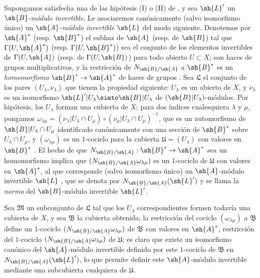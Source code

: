 \documentclass[oneside,10pt]{amsart}
\makeatletter
\newcommand{\ega@arrow}[2]{\mathchoice{#1}{#2}{#2}{#2}}
\renewcommand{\to}{\ega@arrow{\longrightarrow}{\rightarrow}}
\newcommand{\oldpage}[2][]{\marginnote{\normalfont\footnotesize\textbf{#1}~|~#2}\ignorespaces}
\let\EGAOriginalLabel\label
\renewcommand{\label}[1]{\phantomsection\EGAOriginalLabel{#1}}
\makeatother
\begin{document}
\begin{env}[6.5.2]
\label{II.6.5.2}
Supongamos satisfecha una de las hipótesis (I) o (II) de , y sea $\sh{L}'$ un $\sh{B}$-\emph{módulo invertible}.
Le asociaremos canónicamente (salvo isomorfismo único) un $\sh{A}$-\emph{módulo invertible} $\sh{L}$ del modo siguiente.
Denotemos por $\sh{A}^*$ (resp. $\sh{B}^*$) el subhaz de $\sh{A}$ (resp. de $\sh{B}$) tal que $\Gamma(U,\sh{A}^*)$ (resp. $\Gamma(U,\sh{B}^*)$) sea el conjunto de los elementos invertibles de $\Gamma(U,\sh{A})$ (resp. de $\Gamma(U,\sh{B})$) para todo abierto $U\subset X$;
\oldpage[II]{127}
son haces de grupos multiplicativos, y la restricción de $N_{\sh{B}/\sh{A}}$ a $\sh{B}^*$ es un \emph{homomorfismo} $\sh{B}^*\to\sh{A}^*$ de haces de grupos .
Sea $\mathfrak{L}$ el conjunto de los pares $(U_\lambda,\nu_\lambda)$ que tienen la propiedad siguiente: $U_\lambda$ es un abierto de $X$, y $\nu_\lambda$ es un isomorfismo $\sh{L}'|U_\lambda\simto\sh{B}|U_\lambda$ de $(\sh{B}|U_\lambda)$-módulos.
Por hipótesis, los $U_\lambda$ forman una cubierta de $X$;
para dos índices cualesquiera $\lambda$ y $\mu$, pongamos $\omega_{\lambda\mu}=(\nu_\lambda|U_\lambda\cap U_\mu)\circ(\nu_\mu|U_\lambda\cap U_\mu)^{-1}$, que es un automorfismo de $\sh{B}|U_\lambda\cap U_\mu$ identificado canónicamente con una sección de $\sh{B}^*$ sobre $U_\lambda\cap U_\mu$, y $(\omega_{\lambda\mu})$ es un $1$-cociclo para la cubierta $\mathfrak{U}=(U_\lambda)$ con valores en $\sh{B}^*$ .
El hecho de que $N_{\sh{B}/\sh{A}}:\sh{B}^*\to\sh{A}^*$ sea un homomorfismo implica que $(N_{\sh{B}/\sh{A}}\omega_{\lambda\mu})$ es un $1$-cociclo de $\mathfrak{U}$ con valores en $\sh{A}^*$, al que corresponde (salvo isomorfismo único) un $\sh{A}$-módulo invertible $\sh{L}$ , que se denota por $N_{\sh{B}/\sh{A}}(\sh{L}')$ y se llama la \emph{norma} del $\sh{B}$-módulo invertible $\sh{L}'$.

Sea $\mathfrak{M}$ un subconjunto de $\mathfrak{L}$ tal que los $U_\lambda$ correspondientes formen todavía una cubierta de $X$, y sea $\mathfrak{B}$ la cubierta obtenida;
la restricción del cociclo $(\omega_{\lambda\mu})$ a $\mathfrak{B}$ define un $1$-cociclo $(N_{\sh{B}/\sh{A}}\omega_{\lambda\mu})$ de $\mathfrak{B}$ con valores en $\sh{A}^*$, restricción del $1$-cociclo $(N_{\sh{B}/\sh{A}}\omega_{\lambda\mu})$ de $\mathfrak{U}$;
es claro que existe un isomorfismo canónico del $\sh{A}$-módulo invertible definido por este $1$-cociclo de $\mathfrak{B}$ en $N_{\sh{B}/\sh{A}}(\sh{L}')$, lo que permite definir este $\sh{A}$-módulo invertible mediante una subcubierta cualquiera de $\mathfrak{U}$.


\end{env}
\end{document}
